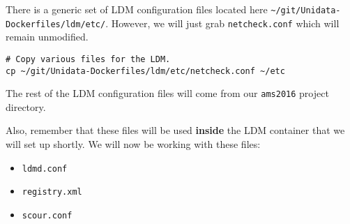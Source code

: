 \documentclass[11pt]{article}
\begin{document}
There is a generic set of LDM configuration files located here \texttt{\textasciitilde{}/git/Unidata-Dockerfiles/ldm/etc/}. However, we will just grab \texttt{netcheck.conf} which will remain unmodified.

\begin{verbatim}
# Copy various files for the LDM.
cp ~/git/Unidata-Dockerfiles/ldm/etc/netcheck.conf ~/etc
\end{verbatim}

The rest of the LDM configuration files will come from our \texttt{ams2016} project directory.

Also, remember that these files will be used \textbf{inside} the LDM container that we will set up shortly. We will now be working with these files:

\begin{itemize}
\item \texttt{ldmd.conf}
\item \texttt{registry.xml}
\item \texttt{scour.conf}
\end{itemize}
\end{document}
